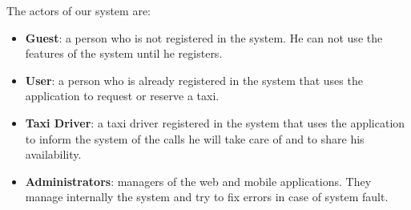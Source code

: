 The actors of our system are:
\begin{itemize}
	\item \textbf{Guest}: a person who is not registered in the system. He can not use the features of the system until he registers. 
	\item \textbf{User}: a person who is already registered in the system that uses the application to request or reserve a taxi.
	\item \textbf{Taxi Driver}: a taxi driver registered in the system that uses the application to inform the system of the calls he will take care of and to share his availability.
	\item \textbf{Administrators}: managers of the web and mobile applications. They manage internally the system and try to fix errors in case of system fault.
\end{itemize}